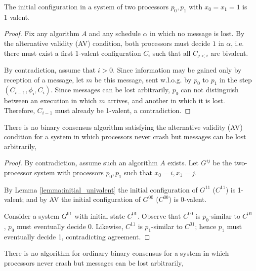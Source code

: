 \begin{lemma} \label{lemma:initial_univalent}
The initial configuration in a system of two processors $p_0, p_1$ with $x_0 = x_1 = 1$
is 1-valent.
\end{lemma}


\begin{proof}
Fix any algorithm $A$ and any schedule $\alpha$ in which no message is lost.
By the alternative validity (AV) condition, both processors must decide $1$
in $\alpha$, i.e. there must exist a first 1-valent configuration $C_i$
such that all $C_{j < i}$ are bivalent.

By contradiction, assume that $i > 0$.
Since information may be gained only by reception of a message,
let $m$ be this message, sent w.l.o.g. by $p_0$ to $p_1$ in the step 
$(C_{i-1}, \phi_i, C_i)$. Since messages can be lost arbitrarily, $p_0$
can not distinguish between an execution in which $m$ arrives, and another
in which it is lost. Therefore, $C_{i-1}$ must already be 1-valent, a
contradiction.
\end{proof}

\begin{theorem} \label{thm:no_av_consensus}
There is no binary consensus algorithm satisfying the alternative validity (AV)
condition for a system in which processors never crash but messages can be
lost arbitrarily,
\end{theorem}

\begin{proof}
By contradiction, assume such an algorithm $A$ exists.
Let $G^{ij}$ be the two-processor system with processors
$p_0, p_1$ such that $x_0 = i, x_1 = j$.

By Lemma \ref{lemma:initial_univalent} the initial configuration of
$G^{11}$ ($C^{11}$) is 1-valent; and by AV the initial configuration
of $G^{00}$ ($C^{00}$) is 0-valent.

Consider a system $G^{01}$ with initial state $C^{01}$.
Observe that $C^{00}$ is $p_0$-similar to $C^{01}$, $p_0$ must eventually decide 0.
Likewise, $C^{11}$ is $p_1$-similar to $C^{01}$; hence $p_1$ must eventually
decide 1, contradicting agreement.
\end{proof}

\begin{theorem}
There is no algorithm for ordinary binary consensus
for a system in which processors never crash but messages can be
lost arbitrarily,
\end{theorem}

